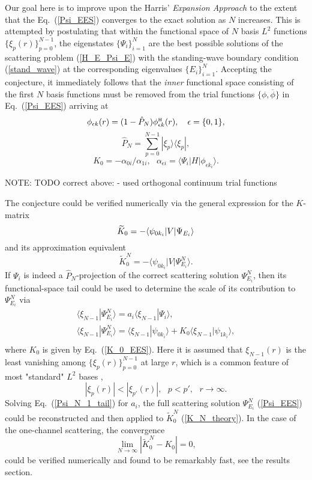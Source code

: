 \documentclass[aip
, pra
, showpacs
, aps
, twocolumn
, groupedaddress
, floatfix
]{revtex4}
\newcommand{\beq}{\begin{equation}}
\newcommand{\eeq}{\end{equation}}
\newcommand{\barr}{\begin{array}}
\newcommand{\earr}{\end{array}}
\newcommand{\phiH}{\phi^{\mbox{\tiny{H}}}}
\begin{document}
Our goal here is to improve upon the Harris' {\em Expansion Approach} \cite{Harris67} to the extent that the Eq.~(\ref{Psi_EES})
converges to the exact solution as $N$ increases.
This is attempted by postulating that
within the functional space of $N$ basis $L^2$ functions  $\{\xi_p(r)\}_{p=0}^{N-1}$,
the eigenstates $\{\Psi_i\}_{i=1}^{N}$ are the best possible solutions of the scattering problem (\ref{H_E_Psi_E})
with the standing-wave boundary condition (\ref{stand_wave}) at the corresponding eigenvalues $\{E_i\}_{i=1}^{N}$.
Accepting the conjecture, it immediately follows that the {\em inner} functional space consisting of the first $N$ basis functions
must be removed from the trial functions $\{\phi,\overline{\phi}\}$ in Eq.~(\ref{Psi_EES}) arriving at
\beq 
\phi_{\epsilon k}(r) = (1-\hat{P}_N) \phiH_{\epsilon k}(r),\ \ \ \epsilon = \{0,1\},
\label{def_phi} \eeq
\beq
\hat{P}_N = \sum_{p=0}^{N-1} | \xi_p \rangle \langle \xi_p |,
\label{P_N} \eeq
\beq 
K_{0} = - \alpha_{0i} / \alpha_{1i}, \ \ \ 
\alpha_{\epsilon i} = \langle\Psi_i|H|  \phi_{\epsilon k_i} \rangle.
\label{K_0_EES} \eeq

NOTE: TODO correct above: \cite{HM69} - used orthogonal continuum trial functions


The conjecture could be verified numerically via the general expression for the $K$-matrix \cite{N82}
\beq
\widetilde{K}_0 = -\langle \psi_{0k_i} | V | \Psi_{E_i} \rangle\\
\label{K_theory}\eeq
and its approximation equivalent
\beq
\widetilde{K}^N_0 = -\langle \psi_{0k_i} | V | \Psi^N_{E_i} \rangle.
\label{K_N_theory}\eeq
If $\Psi_i$ is indeed a $\hat{P}_N$-projection of the correct scattering solution $\Psi^N_{E_i}$,
then its functional-space tail could be used to
determine the scale of its contribution to $\Psi^N_{E_i}$ via
\beq \barr{l}
\langle \xi_{N-1} | \Psi^N_{E_i}\rangle
= a_i \langle \xi_{N-1}| \Psi_i \rangle,\\
\langle \xi_{N-1} | \Psi^N_{E_i}\rangle
 =  \langle \xi_{N-1}| \psi_{0k_i} \rangle
+ K_0 \langle \xi_{N-1}| \psi_{1k_i} \rangle,\\
\earr \label{Psi_N_1_tail} \eeq
where $K_0$ is given by Eq.~(\ref{K_0_EES}).
Here it is assumed that $\xi_{N-1}(r)$ is the least vanishing among $\{\xi_p(r)\}_{p=0}^{N-1}$  at large $r$, which is
a common feature of most "standard" $L^2$ bases \cite{abramowitz},
\beq
|\xi_p(r)| < |\xi_{p'}(r)|, \ \ \ p<p', \ \ \ r \rightarrow \infty.
\eeq
Solving Eq.~(\ref{Psi_N_1_tail}) for $a_i$,
the full scattering solution $\Psi^N_{E_i}$ (\ref{Psi_EES}) could be reconstructed and then applied to $\widetilde{K}^N_0$ (\ref{K_N_theory}).
In the case of the one-channel scattering, the convergence
\beq
\lim_{N \rightarrow \infty} |\widetilde{K}^N_0 - K_0 | = 0,
\label{K_N_0_lim} \eeq
could be verified numerically and found to be
remarkably fast, see the results section.
\end{document}
